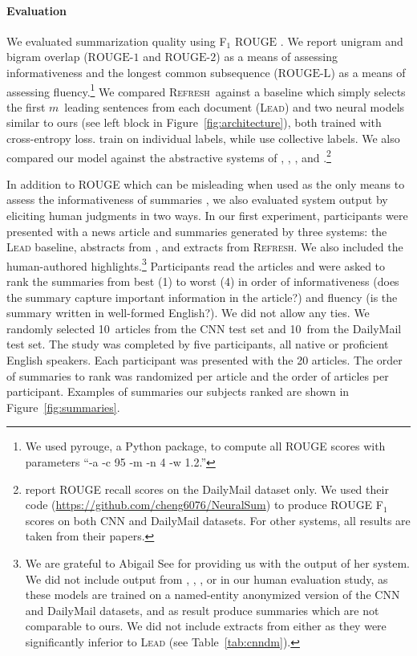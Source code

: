 \documentclass[11pt,a4paper]{article}
\newcommand\refresh{\textsc{Refresh}}
\begin{document}
\paragraph{Evaluation}
We evaluated summarization quality using F$_1$ $\mbox{ROUGE}$
\cite{rouge}. We report unigram and bigram overlap ($\mbox{ROUGE-1}$
and $\mbox{ROUGE-2}$) as a means of assessing informativeness and the
longest common subsequence ($\mbox{ROUGE-L}$) as a means of assessing
fluency.\footnote{We used pyrouge, a Python package, to compute all
  ROUGE scores with parameters ``-a -c 95 -m -n 4 -w 1.2.''}  We
compared \refresh\ against a baseline which simply selects the first
$m$~leading sentences from each document (\textsc{Lead}) and two
neural models similar to ours (see left block in
Figure~\ref{fig:architecture}), both trained with cross-entropy loss.
 train on individual labels, while
 use collective labels. We also compared our
model against the abstractive systems of ,
, , and
.\footnote{ report ROUGE
  recall scores on the DailyMail dataset only. We used their code
  (\url{https://github.com/cheng6076/NeuralSum}) to produce ROUGE
  F$_1$ scores on both CNN and DailyMail datasets. For other systems,
  all results are taken from their papers.}



In addition to ROUGE which can be misleading when used as the only
means to assess the informativeness of summaries
\cite{schluter:2017:EACLshort}, we also evaluated system output by
eliciting human judgments in two ways. In our first experiment,
participants were presented with a news article and summaries
generated by three systems: the \textsc{Lead} baseline, abstracts from
, and extracts from \refresh. We also included the
human-authored highlights.\footnote{We are grateful to Abigail See for
  providing us with the output of her system. We did not include
  output from , ,
  , or  in our human
  evaluation study, as these models are trained on a named-entity
  anonymized version of the CNN and DailyMail datasets, and as result
  produce  summaries which are not comparable to ours. We
  did not include extracts from  either as they were
  significantly inferior to \textsc{Lead} (see
  Table~\ref{tab:cnndm}).}  Participants read the articles and were
asked to rank the summaries from best (1) to worst (4) in order of
informativeness (does the summary capture important information in the
article?) and fluency (is the summary written in well-formed
English?). We did not allow any ties. We randomly selected 10~articles
from the CNN test set and 10~from the DailyMail test set. The study
was completed by five participants, all native or proficient English
speakers. Each participant was presented with the 20 articles. The
order of summaries to rank was randomized per article and the order of
articles per participant. Examples of summaries our subjects ranked
are shown in Figure~\ref{fig:summaries}.
\end{document}
